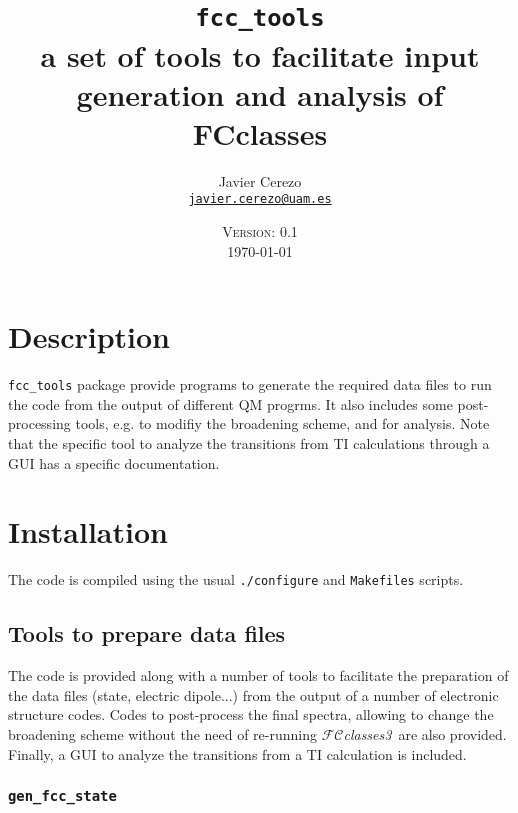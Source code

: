 \documentclass[a4paper,11pt]{article}
\title{\texttt{fcc\_tools}\\ a set of tools to facilitate input generation and analysis of FCclasses}
\date{\textsc{Version: 0.1}\\\today}
\author{Javier Cerezo\\\href{mailto:javier.cerezo@uam.es}{\texttt{javier.cerezo@uam.es}}}
\begin{document}
\setlength{\parskip}{0.5em}
\newcommand{\fcc}{$\mathcal{FC}$\textit{classes}}
\newcommand{\fccIII}{$\mathcal{FC}$\textit{classes3}}

\maketitle

\section{Description}
\texttt{fcc\_tools} package provide programs to generate the required data files to run the code from the output of different QM progrms. It also includes some post-processing tools, e.g. to modifiy the broadening scheme, and for analysis. Note that the specific tool to analyze the transitions  from TI calculations through a GUI has a specific documentation.

\section{Installation}

The code is compiled using the usual \texttt{./configure} and \texttt{Makefiles} scripts.


\subsection{Tools to prepare data files}
The code is provided along with a number of tools to facilitate the preparation of the data files (state, electric dipole...) from the output of a number of electronic structure codes. Codes to post-process the final spectra, allowing to change the broadening scheme without the need of re-running \fccIII\ are also provided. Finally, a GUI to analyze the transitions from a TI calculation is included.

\subsubsection{\texttt{gen\_fcc\_state}}
\end{document}
